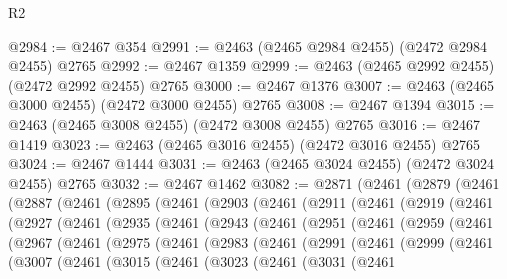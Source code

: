 \begin{lexlean}{R2}
\begin{coremodule}
@2984 := @2467 @354
@2991 := @2463 (@2465 @2984 @2455) (@2472 @2984 @2455) @2765
@2992 := @2467 @1359
@2999 := @2463 (@2465 @2992 @2455) (@2472 @2992 @2455) @2765
@3000 := @2467 @1376
@3007 := @2463 (@2465 @3000 @2455) (@2472 @3000 @2455) @2765
@3008 := @2467 @1394
@3015 := @2463 (@2465 @3008 @2455) (@2472 @3008 @2455) @2765
@3016 := @2467 @1419
@3023 := @2463 (@2465 @3016 @2455) (@2472 @3016 @2455) @2765
@3024 := @2467 @1444
@3031 := @2463 (@2465 @3024 @2455) (@2472 @3024 @2455) @2765
@3032 := @2467 @1462
@3082 := @2871
    (@2461
      (@2879
        (@2461
          (@2887
            (@2461
              (@2895
                (@2461
                  (@2903
                    (@2461
                      (@2911
                        (@2461
                          (@2919
                            (@2461
                              (@2927
                                (@2461
                                  (@2935
                                    (@2461
                                      (@2943
                                        (@2461
                                          (@2951
                                            (@2461
                                              (@2959
                                                (@2461
                                                  (@2967
                                                    (@2461
                                                      (@2975
                                                        (@2461
                                                          (@2983
                                                            (@2461
                                                              (@2991
                                                                (@2461
                                                                  (@2999
                                                                    (@2461
                                                                      (@3007
                                                                        (@2461
                                                                          (@3015
                                                                            (@2461
                                                                              (@3023
                                                                                (@2461
                                                                                  (@3031
                                                                                    (@2461

\end{coremodule}
\end{lexlean}
